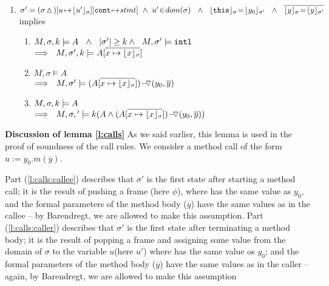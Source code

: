 \begin{lemma}
\begin{enumerate}
\begin{enumerate}
\end{enumerate}
\item
\label{l:calls:caller}
$\sigma'= (\sigma \popSymbol)[u\! \mapsto\! {\interpret {\sigma} {u'}}][\prg{cont}\!\mapsto\! stmt]\ \wedge \ u'\! \in\! dom(\sigma)\ \  \wedge\ \  
 \interpret \sigma {\prg{this}}\! =\! \interpret {\sigma'} {y_0} \ \ \wedge \ \ 
\overline{ {\interpret {\sigma} y}\!=\! {\interpret {\sigma'} y}}$\\
implies

\begin{enumerate}
\item
\label{l:calls:caller:one}
$\satDAssertFrom M  \sigma k   A \ \ \wedge\ \ \DepthSt {\sigma'} \geq k  \wedge\ \ M, \sigma' \models \intThis $ \\
$\Longrightarrow\ \  \satDAssertFrom M  {\sigma'} k   {A[\overline {x \mapsto {\interpret \sigma x}}]}$ 

\item
\label{l:calls:caller:two}
$  M , \sigma \models   A$   \\
$\Longrightarrow\ \  M , \sigma' \models  {\PushASLong  {(y_0,\overline y)}   {(A[\overline {x \mapsto {\interpret \sigma x}}])}}$

\item
\label{l:calls:caller:three}
$\satDAssertFrom M  \sigma k   A $   \\
$\Longrightarrow\ \  \satDAssertFrom M  \sigma' k    {(A \wedge \PushASLong  {(y_0,\overline y)}   {(A[\overline {x \mapsto {\interpret \sigma x}}])})}$

 \end{enumerate}
\end{enumerate}

\end{lemma}

\textbf{Discussion of lemma  \ref{l:calls}}
As we said earlier, this lemma is used in the proof of soundness of the call rules. 
We consider a method call of the form $u:= y_0.m(\overline y)$.

Part (\ref{l:calls:callee}) describes that $\sigma'$ is the first state after starting a method call; it is
the result of pushing a frame (here $\phi$), where  has the same value as $y_0$, 
and the formal parameters of the method body ($\overline y$) have the same values as in the callee -- by Barendregt, we are allowed to make this assumption. 
Part (\ref{l:calls:caller}) describes that $\sigma'$ is the first state after terminating a method body; it is
the result of popping a frame  and assigning  some value from the domain of $\sigma$ to the variable $u$(here $u'$) where \prg{this} has the same value os $y_0$; 
and the formal parameters of the method body ($\overline y$) have the same values as in the caller
-- again,  by Barendregt, we are allowed to make this assumption 

